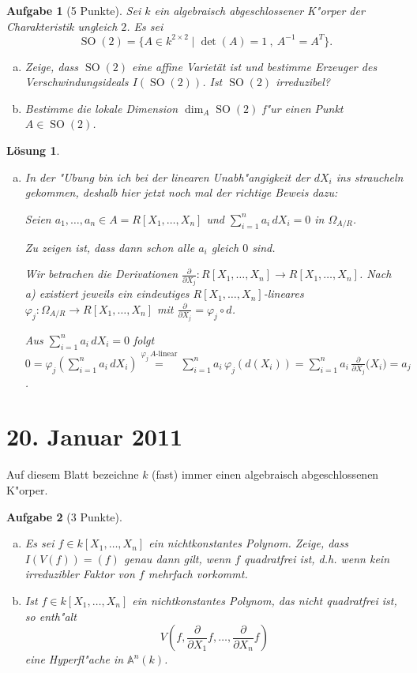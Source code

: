 \documentclass[a4paper, 12pt, numbers=noendperiod, chapterprefix=true]{scrbook}
\theoremstyle{break}
\newtheorem{Aufg}{Aufgabe}
\newtheorem{Loes}{L\"osung}
\theoremstyle{nonumberbreak}
\theoremstyle{nonumberplain}
\newcommand{\set}[2]{\{#1\mid #2\}} %
\newcommand{\pder}[2][]{\frac{\partial #1}{\partial #2}}  %
\DeclareMathOperator{\SO}{SO}
\newcommand{\A}{\mathbb{A}}
\newcommand{\Affine}{\mathbb{A}} %
\begin{document}
\begin{Aufg}[5 Punkte]
Sei $k$ ein algebraisch abgeschlossener K"orper der Charakteristik ungleich $2$. Es sei
	\[\SO(2) = \set{A \in k^{2\times 2}}{\det(A) = 1\ ,\ A^{-1} = A^T}.\]
\begin{enumerate}[a)]
	\item Zeige, dass $\SO(2)$ eine affine Variet\"at ist und bestimme Erzeuger des Verschwindungsideals $I(\SO(2))$. Ist $\SO(2)$ irreduzibel?
	\item Bestimme die lokale Dimension $\dim_A \SO(2)$ f"ur einen Punkt $A\in \SO(2)$.
\end{enumerate}\end{Aufg}

\begin{Loes}\begin{enumerate}[a)]\item[b)]
In der "Ubung bin ich bei der linearen Unabh"angigkeit der $dX_i$ ins straucheln gekommen, deshalb hier jetzt noch mal der richtige Beweis dazu:

Seien $a_1, \dots, a_n \in A = R[X_1, \dots, X_n]$ und $\sum_{i=1}^n a_i \, dX_i = 0$ in $\Omega_{A/R}$.

Zu zeigen ist, dass dann schon alle $a_i$ gleich $0$ sind.

Wir betrachen die Derivationen $\pder{X_j}{} \colon R[X_1, \dots, X_n] \to R[X_1, \dots, X_n]$. Nach a) existiert jeweils ein eindeutiges $R[X_1, \dots, X_n]$-lineares $\varphi_j \colon \Omega_{A/R} \to R[X_1, \dots, X_n]$ mit $\pder{X_j}{} = \varphi_j \circ d$.

Aus $\sum_{i=1}^n a_i \, dX_i = 0$ folgt $0 = \varphi_j(\sum_{i=1}^n a_i \, dX_i) \stackrel{\varphi_j \,  A\textrm{-linear}}{=} \sum_{i=1}^n a_i \, \varphi_j(d(X_i)) = \sum_{i=1}^n a_i \, \pder{X_j}{(X_i}) = a_j$.
\end{enumerate}\end{Loes}

\newpage
\section{20. Januar 2011}
\setcounter{Aufg}{0}
\setcounter{Loes}{1}

Auf diesem Blatt bezeichne $k$ (fast) immer einen algebraisch abgeschlossenen K"orper.

\begin{Aufg}[3 Punkte]
\begin{enumerate}[a)]
	\item Es sei $f\in k[X_1,\dots,X_n]$ ein nichtkonstantes Polynom. Zeige, dass $I(V(f)) = (f)$ genau dann gilt, wenn $f$ quadratfrei ist, d.h. wenn kein irreduzibler Faktor von $f$ mehrfach vorkommt.
	\item Ist $f\in k[X_1,\dots,X_n]$ ein nichtkonstantes Polynom, das nicht quadratfrei ist, so enth"alt
		\[V(f, \pder{X_1}{f},\dots, \pder{X_n}{f})\]
	eine Hyperfl"ache in $\Affine^n(k)$.
\end{enumerate}\end{Aufg}
\end{document}

